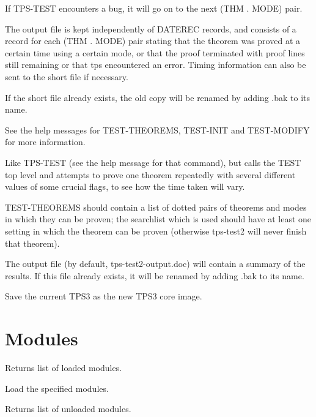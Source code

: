 \begin{description}
If TPS-TEST encounters a bug, it will go on to the next (THM . MODE) pair.

The output file is kept independently of DATEREC records, and consists of a record
for each (THM . MODE) pair stating that the theorem was proved at a certain
time using a certain mode, or that the proof terminated with proof lines still 
remaining or that tps encountered an error.  Timing information can also
be sent to the short file if necessary.

If the short file already exists, the old copy will be renamed by adding 
.bak to its name.

See the help messages for TEST-THEOREMS, TEST-INIT and TEST-MODIFY for more information.

\item[\parbox{\textwidth}{TPS-TEST2 \textit{searchlist} \textit{quiet-run} \textit{expu} \textit{output} \textit{testwin}}]  
Like TPS-TEST (see the help message for that command), but calls
the TEST top level and attempts to prove one theorem repeatedly with several
different values of some crucial flags, to see how the time taken will vary.

TEST-THEOREMS should contain a list of dotted pairs of theorems and modes 
in which they can be proven; the searchlist which is used should have at 
least one setting in which the theorem can be proven (otherwise tps-test2
will never finish that theorem).

The output file (by default, tps-test2-output.doc) will contain a summary of 
the results. If this file already exists, it will be renamed by adding .bak 
to its name.

\item[\parbox{\textwidth}{TPS3-SAVE}]  
Save the current TPS3 as the new TPS3 core image.
\item
\end{description}

\section{Modules}

\begin{description} 
\item[\parbox{\textwidth}{LOADED-MODS}]  
Returns list of loaded modules.

\item[\parbox{\textwidth}{MODULES \textit{modulelist}}]  
Load the specified modules.

\item[\parbox{\textwidth}{UNLOADED-MODS}]  
Returns list of unloaded modules.
\item
\end{description}

